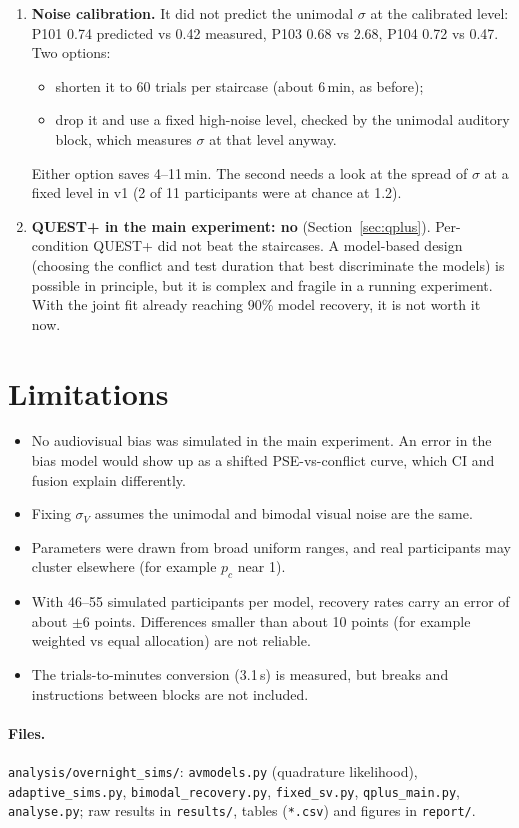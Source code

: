\documentclass[11pt,a4paper]{article}
\begin{document}
\begin{enumerate}
\item \textbf{Noise calibration.} It did not predict the unimodal $\sigma$ at the calibrated level: P101 0.74 predicted vs 0.42 measured, P103 0.68 vs 2.68, P104 0.72 vs 0.47. Two options:
  \begin{itemize}
  \item shorten it to 60 trials per staircase (about 6\,min, as before);
  \item drop it and use a fixed high-noise level, checked by the unimodal auditory block, which measures $\sigma$ at that level anyway.
  \end{itemize}
  Either option saves 4--11\,min. The second needs a look at the spread of $\sigma$ at a fixed level in v1 (2 of 11 participants were at chance at 1.2).
\item \textbf{QUEST+ in the main experiment: no} (Section~\ref{sec:qplus}). Per-condition QUEST+ did not beat the staircases. A model-based design (choosing the conflict and test duration that best discriminate the models) is possible in principle, but it is complex and fragile in a running experiment. With the joint fit already reaching 90\% model recovery, it is not worth it now.
\end{enumerate}

\section{Limitations}
\begin{itemize}
\item No audiovisual bias was simulated in the main experiment. An error in the bias model would show up as a shifted PSE-vs-conflict curve, which CI and fusion explain differently.
\item Fixing $\sigma_V$ assumes the unimodal and bimodal visual noise are the same.
\item Parameters were drawn from broad uniform ranges, and real participants may cluster elsewhere (for example $p_c$ near 1).
\item With 46--55 simulated participants per model, recovery rates carry an error of about $\pm$6 points. Differences smaller than about 10 points (for example weighted vs equal allocation) are not reliable.
\item The trials-to-minutes conversion (3.1\,s) is measured, but breaks and instructions between blocks are not included.
\end{itemize}

\paragraph{Files.} \texttt{analysis/overnight\_sims/}: \texttt{avmodels.py} (quadrature likelihood), \texttt{adaptive\_sims.py}, \texttt{bimodal\_recovery.py}, \texttt{fixed\_sv.py}, \texttt{qplus\_main.py}, \texttt{analyse.py}; raw results in \texttt{results/}, tables (\texttt{*.csv}) and figures in \texttt{report/}.
\end{document}
